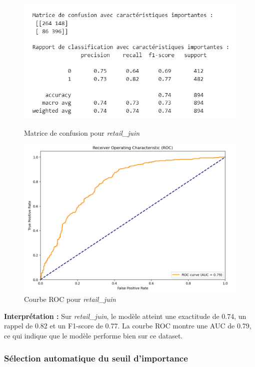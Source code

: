 \begin{figure}[H]
    \centering
    \begin{minipage}{0.45\linewidth}
        \centering
        \includegraphics[width=\linewidth]{capture_modele_14.png}
        \caption{Matrice de confusion pour \textit{retail\_juin}}
    \end{minipage}
    \hfill
    \begin{minipage}{0.45\linewidth}
        \centering
        \includegraphics[width=\linewidth]{capture_modele_15.png}
        \caption{Courbe ROC pour \textit{retail\_juin}}
        \label{fig:roc_juin_rf}
    \end{minipage}
\end{figure}

\textbf{Interprétation :} Sur \textit{retail\_juin}, le modèle atteint une exactitude de 0.74, un rappel de 0.82 et un F1-score de 0.77. La courbe ROC montre une AUC de 0.79, ce qui indique que le modèle performe bien sur ce dataset.
\subsubsection{Sélection automatique du seuil d'importance}

